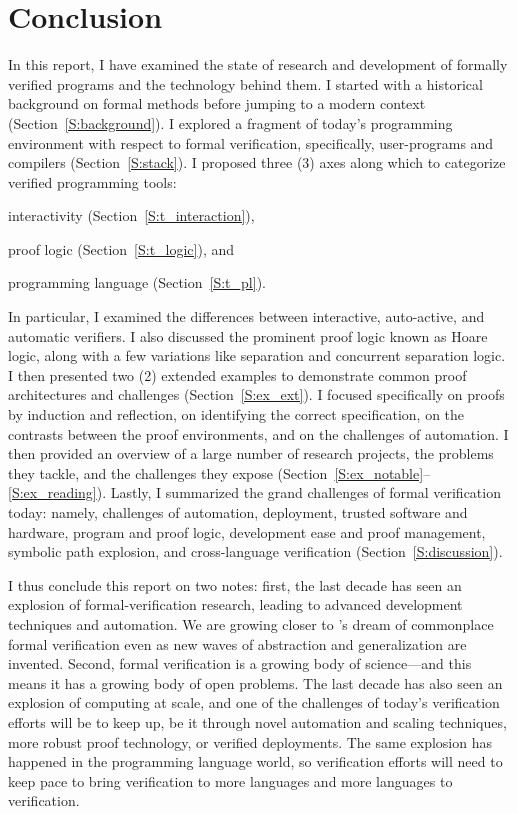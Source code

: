 \section{Conclusion}\label{S:conclusion}

In this report, I have examined the state of research and development of
formally verified programs and the technology behind them. I started with a
historical background on formal methods before jumping to a modern context
(Section~\ref{S:background}). I explored a fragment of today's programming
environment with respect to formal verification, specifically, user-programs and
compilers (Section~\ref{S:stack}). I proposed three (3) axes along which to
categorize verified programming tools:
\begin{inlist}
\item interactivity (Section~\ref{S:t_interaction}),
\item proof logic (Section~\ref{S:t_logic}), and
\item programming language (Section~\ref{S:t_pl}).
\end{inlist}
In particular, I examined the differences between interactive, auto-active, and
automatic verifiers. I also discussed the prominent proof logic known as Hoare
logic, along with a few variations like separation and concurrent separation
logic. I then presented two (2) extended examples to demonstrate common proof
architectures and challenges (Section~\ref{S:ex_ext}). I focused specifically on
proofs by induction and reflection, on identifying the correct specification, on
the contrasts between the proof environments, and on the challenges of
automation. I then provided an overview of a large number of research projects,
the problems they tackle, and the challenges they expose
(Section~\ref{S:ex_notable}--\ref{S:ex_reading}). Lastly, I summarized the grand
challenges of formal verification today: namely, challenges of automation,
deployment, trusted software and hardware, program and proof logic, development
ease and proof management, symbolic path explosion, and cross-language
verification (Section~\ref{S:discussion}).

I thus conclude this report on two notes: first, the last decade has seen an
explosion of formal-verification research, leading to advanced development
techniques and automation. We are growing closer to \citeauthor{EWD:EWD1036}'s
dream of commonplace formal verification even as new waves of abstraction and
generalization are invented. Second, formal verification is a growing body of
science---and this means it has a growing body of open problems. The last decade
has also seen an explosion of computing at scale, and one of the challenges of
today's verification efforts will be to keep up, be it through novel automation
and scaling techniques, more robust proof technology, or verified deployments.
The same explosion has happened in the programming language world, so
verification efforts will need to keep pace to bring verification to more
languages and more languages to verification.

